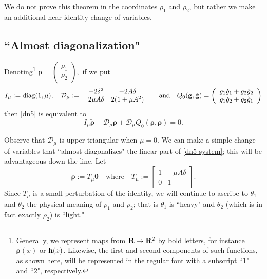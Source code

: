 \documentclass[12pt]{amsart}
\numberwithin{equation}{section}
\newcommand{\ds}{\displaystyle}
\DeclareMathOperator{\diag}{diag}
\newcommand{\be}{\begin{equation}}
\newcommand{\ee}{\end{equation}}
\newcommand{\mand}{\quad \text{and}\quad}
\newcommand{\R}{{\bf{R}}}
\newcommand{\hb}{{\bf{h}}}
\newcommand{\gb}{{\bf{g}}}
\newcommand{\D}{{\mathcal{D}}}
\newcommand{\rhob}{{\boldsymbol \rho}}
\newcommand{\thetab}{{\boldsymbol \theta}}
\begin{document}
We do not prove this theorem in the coordinates $\rho_1$ and $\rho_2$, but rather we make an additional near identity
change of variables.

\subsection{``Almost diagonalization"}
Denoting\footnote{Generally, we represent maps from $\R \to \R^2$ by bold letters, for instance $\rhob(x)$ or $\hb(x)$. 
Likewise, the first and second components of such functions, as shown here, will be represented in the regular font with a subscript ``$1$" and ``$2$", respectively.}
$
\rhob=\ds\left(\begin{array}{c} \rho_1 \\ \rho_2 \end{array} \right),
$
if we put
\be\label{here is Q}
I_\mu:=\diag(1,\mu),\quad
\D_\mu := \left[ \begin{array}{cc}
-2 \delta^2 & -2 A \delta\\
2\mu A\delta &2(1+\mu A^2) 
\end{array}
\right]
\mand 
Q_0(\gb,\grave{\gb}) = \left(\begin{array}{c}
g_1 \grave{g}_1 + g_2 \grave{g}_2\\
g_1 \grave{g}_2 + g_2 \grave{g}_1 
\end{array}
\right)
\ee
then \eqref{dn5} is equivalent to
\be \label{dn5 system}
  I_\mu \ddot{\rhob} + \D_\mu \rhob + \D_\mu Q_0(\rhob,\rhob) = 0.
\ee


Observe that $\D_\mu$ is upper triangular when $\mu = 0$. We can make a simple change
of variables that ``almost diagonalizes" the linear part of \eqref{dn5 system}; this will be advantageous
down the line.
Let\be\label{final cov}
\rhob:= T_\mu \thetab \quad \text{where} \quad
T_\mu:=\left[ \begin{array}{cc} 1 & -\mu A \delta \\ 0 & 1\end{array}\right].
\ee
Since $T_\mu$ is a small perturbation of the identity, we will continue to ascribe to $\theta_1$
and $\theta_2$ the physical meaning of $\rho_1$ and $\rho_2$; that is $\theta_1$ is ``heavy" and $\theta_2$ (which is in fact exactly $\rho_2$) is ``light."
\end{document}
